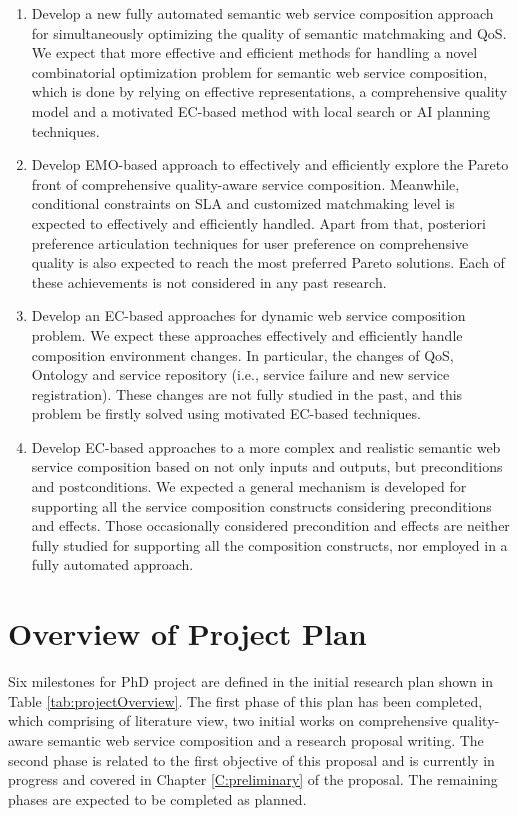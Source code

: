 \begin{enumerate}
 \item Develop a new fully automated semantic web service composition approach for simultaneously optimizing the quality of semantic matchmaking and QoS. We expect that more effective and efficient methods for handling a novel combinatorial optimization problem for semantic web service composition, which is done by relying on effective representations, a comprehensive quality model and a motivated EC-based method with local search or AI planning techniques.

\item Develop EMO-based approach to effectively and efficiently explore the Pareto front of comprehensive quality-aware service composition. Meanwhile, conditional constraints on SLA and customized matchmaking level is expected to effectively and efficiently handled. Apart from that, posteriori preference articulation techniques for user preference on comprehensive quality is also expected to reach the most preferred Pareto solutions. Each of these achievements is not considered in any past research.

\item Develop an EC-based approaches for dynamic web service composition problem. We expect these approaches effectively and efficiently handle composition environment changes. In particular, the changes of QoS, Ontology and service repository (i.e., service failure and new service registration). These changes are not fully studied in the past, and this problem be firstly solved using motivated EC-based techniques.

\item Develop EC-based approaches to a more complex and realistic semantic web service composition based on not only inputs and outputs, but preconditions and postconditions. We expected a general mechanism is developed for supporting all the service composition constructs considering preconditions and effects. Those occasionally considered precondition and effects are neither fully studied for supporting all the composition constructs, nor employed in a fully automated approach.
\end{enumerate}

\section{Overview of Project Plan}

Six milestones for PhD project are defined in the initial research plan shown in Table \ref{tab:projectOverview}. The first phase of this plan has been completed, which comprising of literature view, two initial works on comprehensive quality-aware semantic web service composition and a research proposal writing. The second phase is related to the first objective of this proposal and is currently in progress and covered in Chapter \ref{C:preliminary} of the proposal. The remaining phases are expected to be completed as planned.

